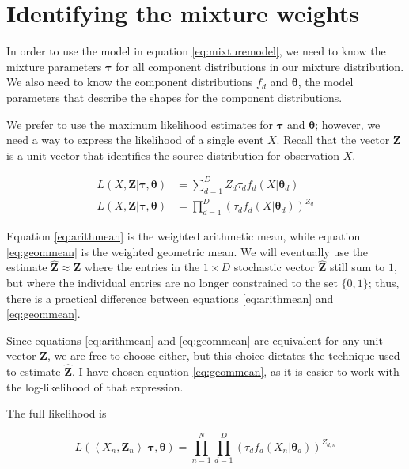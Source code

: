 \section{Identifying the mixture weights}
\label{sec:identifying_the_mixture_weights}
  In order to use the model in equation \ref{eq:mixturemodel}, we need to know
  the mixture parameters $\bm{\tau}$ for all component distributions in our
  mixture distribution. We also need to know the component distributions $f_d$
  and $\bm{\theta}$, the model parameters that describe the shapes for the
  component distributions.

  We prefer to use the maximum likelihood estimates for $\bm{\tau}$ and
  $\bm{\theta}$; however, we need a way to express the likelihood of a single
  event $X$. Recall that the vector $\bm{Z}$ is a unit vector that identifies
  the source distribution for observation $X$.

  \begin{align}
    \label{eq:arithmean}
    L(X, \bm{Z} | \bm{\tau}, \bm{\theta}) &=
        \sum_{d=1}^{D} Z_d \tau_d f_d(X | \bm{\theta}_d) \\
    \label{eq:geommean}
    L(X, \bm{Z} | \bm{\tau}, \bm{\theta}) &=
        \prod_{d=1}^{D} (\tau_d f_d(X | \bm{\theta}_d))^{Z_d}
  \end{align}

  Equation \ref{eq:arithmean} is the weighted arithmetic mean, while equation
  \ref{eq:geommean} is the weighted geometric mean. We will eventually use
  the estimate $\hat{\bm{Z}} \approx \bm{Z}$ where the entries in the $1
  \times D$ stochastic vector $\hat{\bm{Z}}$ still sum to $1$, but where the
  individual entries are no longer constrained to the set $\{0, 1\}$; thus,
  there is a practical difference between equations \ref{eq:arithmean} and
  \ref{eq:geommean}.

  Since equations \ref{eq:arithmean} and \ref{eq:geommean} are equivalent for
  any unit vector $\bm{Z}$, we are free to choose either, but this choice
  dictates the technique used to estimate $\hat{\bm{Z}}$.  I have chosen
  equation \ref{eq:geommean}, as it is easier to work with the log-likelihood of
  that expression.

  The full likelihood is

  \begin{equation}
  \label{eq:fulllikelihood}
    L \left( \left< X_n, \bm{Z}_n \right> |
             \bm{\tau}, \bm{\theta} \right) =
      \prod_{n=1}^{N} \prod_{d=1}^{D} (\tau_d f_d(X_n |
                                       \bm{\theta}_d))^{Z_{d,n}}
  \end{equation}

